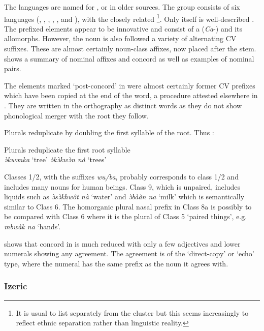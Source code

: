 \documentclass[output=paper]{langsci/langscibook}
\begin{document}
The  languages are named for , or  in older sources. The group consists of six languages (, , , , , and ), with the closely related \footnote{It is usual to list  separately from the  cluster but this seems increasingly to reflect ethnic separation rather than linguistic reality.}. Only  itself is well-described \citep{Follingstad1991}. The prefixed elements appear to be innovative and consist of a (\textit{Ca}-) and its allomorphs. However, the noun is also followed a variety of alternating CV suffixes. These are almost certainly noun-class affixes, now placed after the stem.  shows a summary of  nominal affixes and concord as well as examples of nominal pairs.

The elements marked ‘post-concord’ in  were almost certainly former CV prefixes which have been copied at the end of the word, a procedure attested elsewhere in . They are written in the orthography as distinct words as they do not show phonological merger with the root they follow.


Plurals reduplicate by doubling the first syllable of the root. Thus :


\ea\label{ex:nomaffplat:13}
{ Plurals reduplicate the first root syllable}\\

  \textit{ə̀kwənka}    ‘tree’     \textit{ə̀kə̀kwə̀n nà}   ‘trees’
\z

Classes 1/2, with the suffixes \textit{wu/ba}, probably corresponds to  class 1/2 and includes many  nouns for human beings. Class 9, which is unpaired, includes liquids such as \textit{ə̀sə̀khwôt nà} ‘water’ and \textit{ə̀bààn na} ‘milk’ which is semantically similar to  Class 6. The homorganic plural nasal prefix in Class 8a is possibly to be compared with  Class 6 where it is the plural of Class 5 ‘paired things’, e.g. \textit{mbwàk na} ‘hands’.

\citet[79]{Follingstad1991} shows that concord in  is much reduced with only a few adjectives and lower numerals showing any agreement. The agreement is of the ‘direct-copy’ or ‘echo’ type, where the numeral has the same prefix as the noun it agrees with.

\subsubsection{Izeric} %
\end{document}
